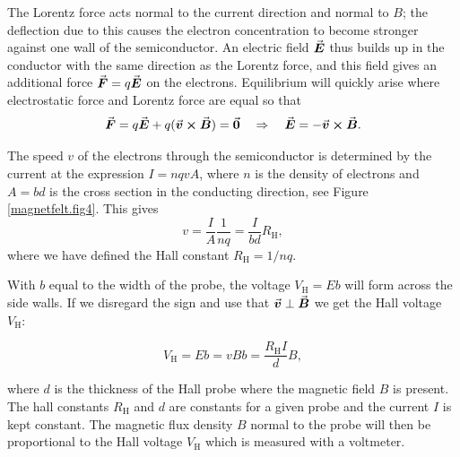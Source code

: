 \documentclass[../Elmag-labhefte-2020.tex]{subfiles}
\begin{document}

The Lorentz force acts normal to the current direction and normal to $B$; the deflection due to this causes the electron concentration to become stronger against one wall of the semiconductor. An electric field $\va*{E}$ thus builds up in the conductor with the same direction as the Lorentz force, and this field gives an additional force $\va*{F} = q \va*{E}$ on the electrons. Equilibrium will quickly arise where electrostatic force and Lorentz force are equal so that
\begin{equation}
    \va*{F} =  q \va*{E} + q(\va*{v} \cross \va*{B}) = \va*{0}
    \quad \Rightarrow \quad
    \va*{E} = -\va*{v} \cross \va*{B} .
\end{equation}

The speed $v$ of the electrons through the semiconductor is determined by the current at the expression $I = nqvA$, where $n$ is the density of electrons and $A = bd$ is the cross section in the conducting direction, see Figure \ref{magnetfelt.fig4}. This gives
\begin{equation}
    v = \frac{I}{A} \frac{1}{nq} 
        = \frac{I}{bd} R_\text{H},
\end{equation}
where we have defined the Hall constant $R_\text{H} = 1/nq$.

With $b$ equal to the width of the probe, the voltage $V_\text{H} = E b$ will form across the side walls. If we disregard the sign and use that $\va*{v} \perp \va*{B}$ we get the Hall voltage $V_\text{H}$:

\begin{equation}
    V_\text{H} = Eb
        =  vBb 
        = \frac{R_\text{H} I}{d} B,
    \label{eq:Hall}
\end{equation}

where $d$ is the thickness of the Hall probe where the magnetic field $B$ is present. The hall constants $R_\text{H}$ and $d$ are constants for a given probe and the current $I$ is kept constant. The magnetic flux density $B$ normal to the probe will then be proportional to the Hall voltage $V_\text{H}$ which is measured with a voltmeter.
\end{document}
